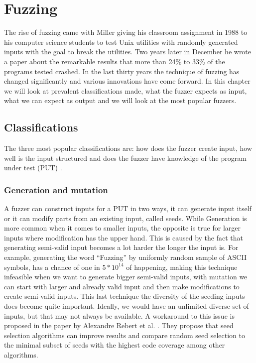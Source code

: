 \chapter{Fuzzing}
\label{cha:3:fuzzing}
\label{fuzzing:intro}
The rise of fuzzing came with Miller giving his classroom assignment \cite{21FuzzingAssignment} in 1988 to his computer science students to test Unix utilities with randomly generated inputs with the goal to break the utilities. Two years later in December he wrote a paper \cite{4originalFuzzingUnixUtils} about the remarkable results that more than 24\% to 33\% of the programs tested crashed.
In the last thirty years the technique of fuzzing has changed significantly and various innovations have come forward. In this chapter we will look at prevalent classifications made, what the fuzzer expects as input, what we can expect as output and we will look at the most popular fuzzers.

\section{Classifications}
\label{fuzzing:Classifications}
The three most popular classifications are: how does the fuzzer create input, how well is the input structured and does the fuzzer have knowledge of the program under test (PUT) \cite{30FuzzingHackartandscience, 12Fuzzingasurvey, 13manes2019survey}.

\subsection{Generation and mutation}
\label{fuzzing:generationMutation}
A fuzzer can construct inputs for a PUT in two ways, it can generate input itself or it can modify parts from an existing input, called seeds. While Generation is more common when it comes to smaller inputs, the opposite is true for larger inputs where modification has the upper hand. This is caused by the fact that generating semi-valid input becomes a lot harder the longer the input is. For example, generating the word “Fuzzing” by uniformly random sample of ASCII symbols, has a chance of one in $5*10^{14}$ of happening, making this technique infeasible when we want to generate bigger semi-valid inputs, with mutation we can start with larger and already valid input and then make modifications to create semi-valid inputs. This last technique the diversity of the seeding inputs does become quite important. Ideally, we would have an unlimited diverse set of inputs, but that may not always be available. A workaround to this issue is proposed in the paper by Alexandre Rebert et al. \cite{14rebert2014seedselecting}. They propose that seed selection algorithms can improve results and compare random seed selection to the minimal subset of seeds with the highest code coverage among other algorithms. 

